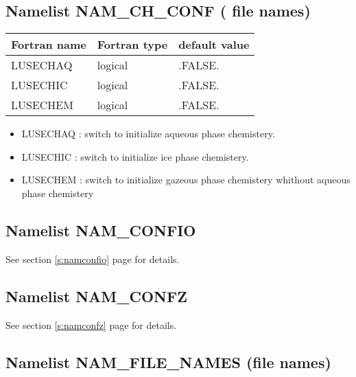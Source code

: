 \subsection{Namelist NAM\_CH\_CONF ( file names)}

\begin{center}
\begin{tabular} {|l|l|l|}
\hline
Fortran name & Fortran type & default value\\
\hline
\hline
LUSECHAQ  & logical  & .FALSE.  \\
LUSECHIC  & logical  & .FALSE.   \\
LUSECHEM  & logical  & .FALSE.   \\

\hline
\end{tabular}
\end{center}

\begin{itemize}
\item LUSECHAQ : switch to initialize aqueous phase chemistery.
\item LUSECHIC : switch to initialize ice  phase chemistery.
\item LUSECHEM : switch to initialize gazeous phase chemistery whithout aqueous phase chemistery

\end{itemize}

\subsection{Namelist NAM\_CONFIO}
See section \ref{s:namconfio} page \pageref{s:namconfio} for details.

\subsection{Namelist NAM\_CONFZ}
See section \ref{s:namconfz} page \pageref{s:namconfz} for details.

\subsection{Namelist NAM\_FILE\_NAMES (file names)}\label{s:namfilenames}

